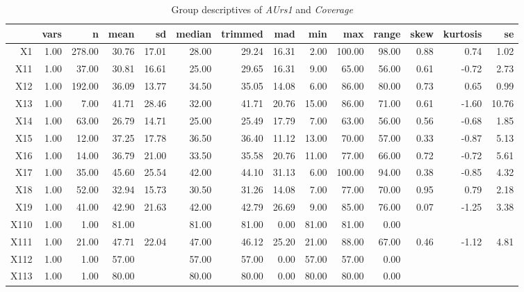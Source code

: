 \begin{table}[ht]
	\small
	\centering
	\begin{tabular}{rrrrrrrrrrrrrr}
		\hline
	   & vars & n & mean & sd & median & trimmed & mad & min & max & range & skew & kurtosis & se \\ 
		\hline
	  X1 & 1.00 & 278.00 & 30.76 & 17.01 & 28.00 & 29.24 & 16.31 & 2.00 & 100.00 & 98.00 & 0.88 & 0.74 & 1.02 \\ 
		X11 & 1.00 & 37.00 & 30.81 & 16.61 & 25.00 & 29.65 & 16.31 & 9.00 & 65.00 & 56.00 & 0.61 & -0.72 & 2.73 \\ 
		X12 & 1.00 & 192.00 & 36.09 & 13.77 & 34.50 & 35.05 & 14.08 & 6.00 & 86.00 & 80.00 & 0.73 & 0.65 & 0.99 \\ 
		X13 & 1.00 & 7.00 & 41.71 & 28.46 & 32.00 & 41.71 & 20.76 & 15.00 & 86.00 & 71.00 & 0.61 & -1.60 & 10.76 \\ 
		X14 & 1.00 & 63.00 & 26.79 & 14.71 & 25.00 & 25.49 & 17.79 & 7.00 & 63.00 & 56.00 & 0.56 & -0.68 & 1.85 \\ 
		X15 & 1.00 & 12.00 & 37.25 & 17.78 & 36.50 & 36.40 & 11.12 & 13.00 & 70.00 & 57.00 & 0.33 & -0.87 & 5.13 \\ 
		X16 & 1.00 & 14.00 & 36.79 & 21.00 & 33.50 & 35.58 & 20.76 & 11.00 & 77.00 & 66.00 & 0.72 & -0.72 & 5.61 \\ 
		X17 & 1.00 & 35.00 & 45.60 & 25.54 & 42.00 & 44.10 & 31.13 & 6.00 & 100.00 & 94.00 & 0.38 & -0.85 & 4.32 \\ 
		X18 & 1.00 & 52.00 & 32.94 & 15.73 & 30.50 & 31.26 & 14.08 & 7.00 & 77.00 & 70.00 & 0.95 & 0.79 & 2.18 \\ 
		X19 & 1.00 & 41.00 & 42.90 & 21.63 & 42.00 & 42.79 & 26.69 & 9.00 & 85.00 & 76.00 & 0.07 & -1.25 & 3.38 \\ 
		X110 & 1.00 & 1.00 & 81.00 &  & 81.00 & 81.00 & 0.00 & 81.00 & 81.00 & 0.00 &  &  &  \\ 
		X111 & 1.00 & 21.00 & 47.71 & 22.04 & 47.00 & 46.12 & 25.20 & 21.00 & 88.00 & 67.00 & 0.46 & -1.12 & 4.81 \\ 
		X112 & 1.00 & 1.00 & 57.00 &  & 57.00 & 57.00 & 0.00 & 57.00 & 57.00 & 0.00 &  &  &  \\ 
		X113 & 1.00 & 1.00 & 80.00 &  & 80.00 & 80.00 & 0.00 & 80.00 & 80.00 & 0.00 &  &  &  \\ 
		 \hline
	  \end{tabular}
    \caption{Group descriptives of \textit{AUrs1} and \textit{Coverage}}
    \label{tbl:descriptives_baysis_initiator_AUrs1_Cov}
\end{table}

